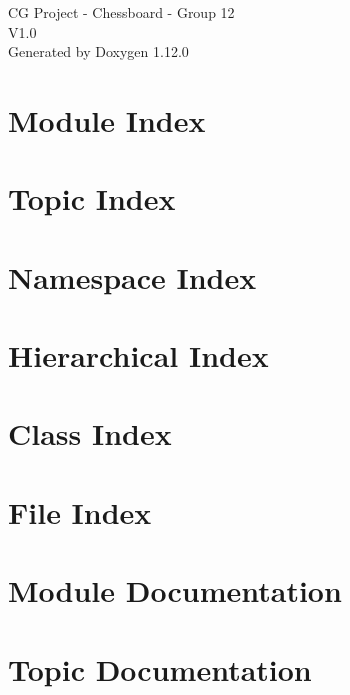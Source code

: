 \documentclass[twoside]{book}
\newcommand{\+}{\discretionary{\mbox{\scriptsize$\hookleftarrow$}}{}{}}
\newcommand{\clearemptydoublepage}{%
    \newpage{\pagestyle{empty}\cleardoublepage}%
  }
\begin{document}
  \raggedbottom
    \hypersetup{pageanchor=false,
                bookmarksnumbered=true,
                pdfencoding=unicode
               }
  \begin{titlepage}
  \vspace*{7cm}
  \begin{center}%
  {\Large CG Project -\/ Chessboard -\/ Group 12}\\
  [1ex]\large V1.\+0 \\
  \vspace*{1cm}
  {\large Generated by Doxygen 1.12.0}\\
  \end{center}
  \end{titlepage}
  \clearemptydoublepage
  \tableofcontents
  \clearemptydoublepage
  \hypersetup{pageanchor=true}


\chapter{Module Index}

\chapter{Topic Index}

\chapter{Namespace Index}

\chapter{Hierarchical Index}

\chapter{Class Index}

\chapter{File Index}

\chapter{Module Documentation}

\chapter{Topic Documentation}




\end{document}
